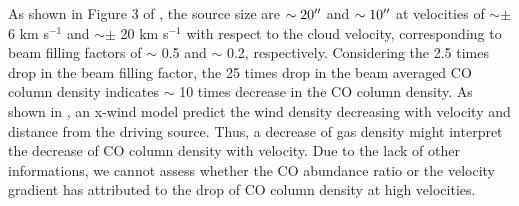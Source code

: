 As shown in Figure 3 of \citet{2009ApJ...696...66Q}, the source size are $\sim 20\mbox{$^{\prime\prime}$}$ and $\sim 10\mbox{$^{\prime\prime}$}$ at velocities of $\sim \pm$ 6 km s$^{-1}$ and $\sim \pm$ 20 km s$^{-1}$ with respect to the cloud velocity, corresponding to beam filling factors of $\sim$ 0.5 and $\sim$ 0.2, respectively. Considering the 2.5 times drop in the beam filling factor, the 25 times drop in the beam averaged CO column density indicates $\sim$ 10 times decrease in the CO column density. As shown in \citet{1995ApJ...455L.155S}, an x-wind model predict the wind density decreasing with velocity and distance from the driving source. Thus, a decrease of gas density might interpret the decrease of CO column density with velocity. Due to the lack of other informations, we cannot assess whether the CO abundance ratio or the velocity gradient has attributed to the drop of CO column density at high velocities.